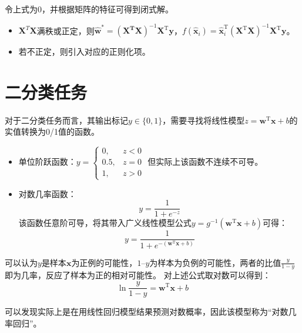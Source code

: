 令上式为0，并根据矩阵的特征可得到闭式解。
\begin{itemize}
    \item $\mathbf{X}^T\mathbf{X}$满秩或正定，则$ \hat{\boldsymbol{w}}^{*}=\left(\mathbf{X}^{\mathbf{T}} \mathbf{X}\right)^{-1} \mathbf{X}^{\mathrm{T}} \boldsymbol{y} $，$ f\left(\hat{\boldsymbol{x}}_{i}\right)=\hat{\boldsymbol{x}}_{i}^{\mathrm{T}}\left(\mathbf{X}^{\mathrm{T}} \mathbf{X}\right)^{-1} \mathbf{X}^{\mathrm{T}} \boldsymbol{y} $。
    \item 若不正定，则引入对应的正则化项。
\end{itemize}

\section{二分类任务}\label{sec:3.3}
对于二分类任务而言，其输出标记$y\in \{0,1\}$，需要寻找将线性模型$z = \boldsymbol{w}^\mathrm{T}\boldsymbol{x}+b$的实值转换为0/1值的函数。

\begin{itemize}
    \item 单位阶跃函数：$ y=\left\{\begin{aligned} 0, & z<0 \\ 0.5, & z=0 \\ 1, & z>0\end{aligned}\right. $
    但实际上该函数不连续不可导。
    \item 对数几率函数：\[
        y=\frac{1}{1+e^{-z}}\]
    该函数任意阶可导，将其带入广义线性模型公式$y = g^{-1}(\boldsymbol{w}^\mathrm{T}\boldsymbol{x}+b)$可得：
    \[
    y=\frac{1}{1+e^{-(\boldsymbol{w}^\mathrm{T}\boldsymbol{x}+b)}}\]
\end{itemize}

可以认为$y$是样本$\boldsymbol{x}$为正例的可能性，$1–y$为样本为负例的可能性，两者的比值$\frac{y}{1-y}$即为几率，反应了样本为正的相对可能性。
对上述公式取对数可以得到：
\[
\ln\frac{y}{1-y} = \boldsymbol{w}^\mathrm{T}\boldsymbol{x}+b
\]

可以发现实际上是在用线性回归模型结果预测对数概率，因此该模型称为“对数几率回归”。


